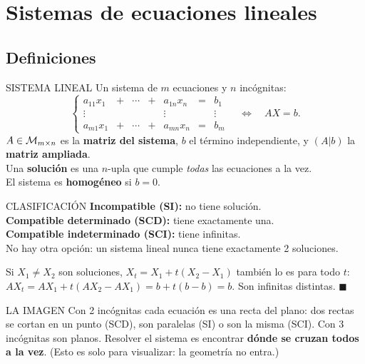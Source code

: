 \chapter{Sistemas de ecuaciones lineales}

\section{Definiciones}
\begin{sello}{SISTEMA LINEAL}
Un sistema de $m$ ecuaciones y $n$ incógnitas:
\[\left\{\begin{array}{ccccccc}
a_{11}x_1&+&\cdots&+&a_{1n}x_n&=&b_1\\
\vdots&&&&\vdots&&\vdots\\
a_{m1}x_1&+&\cdots&+&a_{mn}x_n&=&b_m
\end{array}\right.\quad\iff\quad AX=b.\]
$A\in\mathcal{M}_{m\times n}$ es la \textbf{matriz del sistema}, $b$ el término independiente, y $(A|b)$ la \textbf{matriz ampliada}.\\[2pt]
Una \textbf{solución} es una $n$-upla que cumple \emph{todas} las ecuaciones a la vez.\\[2pt]
El sistema es \textbf{homogéneo} si $b=0$.
\end{sello}
\begin{sello}{CLASIFICACIÓN}
\textbf{Incompatible (SI):} no tiene solución.\\
\textbf{Compatible determinado (SCD):} tiene exactamente una.\\
\textbf{Compatible indeterminado (SCI):} tiene infinitas.\\[2pt]
No hay otra opción: un sistema lineal nunca tiene exactamente 2 soluciones.
\end{sello}
\begin{demo}
Si $X_1\neq X_2$ son soluciones, $X_t=X_1+t(X_2-X_1)$ también lo es para todo $t$:
$AX_t=AX_1+t(AX_2-AX_1)=b+t(b-b)=b$. Son infinitas distintas. $\blacksquare$
\end{demo}
\begin{tip}{LA IMAGEN}
Con 2 incógnitas cada ecuación es una recta del plano: dos rectas se cortan en un punto (SCD), son paralelas (SI) o son la misma (SCI). Con 3 incógnitas son planos. Resolver el sistema es encontrar \textbf{dónde se cruzan todos a la vez}. (Esto es solo para visualizar: la geometría no entra.)
\end{tip}

